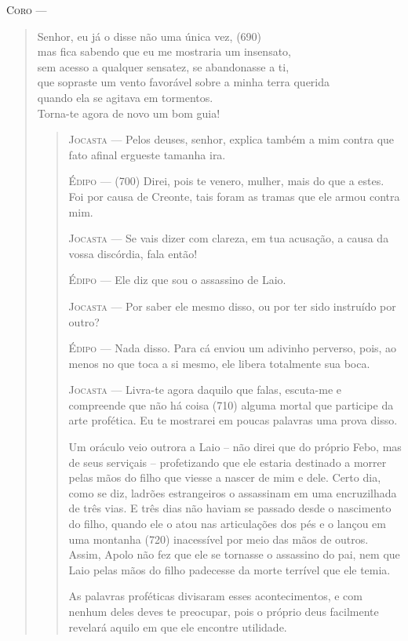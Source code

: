\textsc{Coro} --- \begin{verse}Senhor, eu já o disse não uma única vez, (690)\\
mas fica sabendo que eu me mostraria um insensato,\\
sem acesso a qualquer sensatez, se abandonasse a ti,\\
que sopraste um vento favorável sobre a minha terra querida\\
quando ela se agitava em tormentos.\\
Torna-te agora de novo um bom guia!
\begin{verse}

\textsc{Jocasta} --- Pelos deuses, senhor, explica também a mim contra que fato afinal
ergueste tamanha ira.

\textsc{Édipo} --- (700) Direi, pois te venero, mulher, mais do que a estes. Foi por causa
de Creonte, tais foram as tramas que ele armou contra mim.

\textsc{Jocasta} --- Se vais dizer com clareza, em tua acusação, a causa da vossa discórdia,
fala então!

\textsc{Édipo} --- Ele diz que sou o assassino de Laio.

\textsc{Jocasta} --- Por saber ele mesmo disso, ou por ter sido instruído por outro?

\textsc{Édipo} --- Nada disso. Para cá enviou um adivinho perverso, pois, ao menos no que
toca a si mesmo, ele libera totalmente sua boca.

\textsc{Jocasta} --- Livra-te agora daquilo que falas, escuta-me e compreende que não há
coisa (710) alguma mortal que participe da arte profética. Eu te
mostrarei em poucas palavras uma prova disso.

Um oráculo veio outrora a Laio -- não direi que do próprio Febo, mas de
seus serviçais -- profetizando que ele estaria destinado a morrer pelas
mãos do filho que viesse a nascer de mim e dele. Certo dia, como se diz,
ladrões estrangeiros o assassinam em uma encruzilhada de três vias. E
três dias não haviam se passado desde o nascimento do filho, quando ele
o atou nas articulações dos pés e o lançou em uma montanha (720)
inacessível por meio das mãos de outros. Assim, Apolo não fez que ele se
tornasse o assassino do pai, nem que Laio pelas mãos do filho padecesse
da morte terrível que ele temia.

As palavras proféticas divisaram esses acontecimentos, e com nenhum
deles deves te preocupar, pois o próprio deus facilmente revelará aquilo
em que ele encontre utilidade.


\end{verse}
\end{verse}
